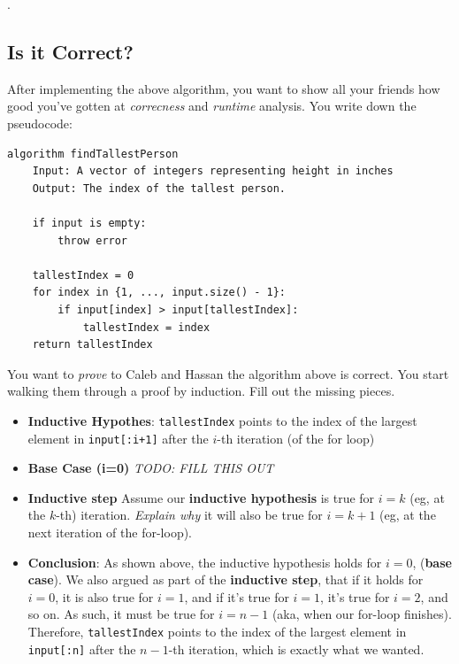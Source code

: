 \documentclass [12pt]{article}
\begin{document}
.


\subsection{Is it Correct?}
 After implementing the above algorithm, you want to show all your friends how good you've gotten at \textit{correcness} and \textit{runtime} analysis. You write down the pseudocode:

\begin{verbatim}
algorithm findTallestPerson
    Input: A vector of integers representing height in inches
    Output: The index of the tallest person.

    if input is empty:
        throw error

    tallestIndex = 0
    for index in {1, ..., input.size() - 1}:
        if input[index] > input[tallestIndex]:
            tallestIndex = index
    return tallestIndex
\end{verbatim}

You want to \textit{prove} to Caleb and Hassan the algorithm above is correct. You start walking them through a proof by induction. Fill out the missing pieces.

\begin{itemize}
    \item \textbf{Inductive Hypothes}: \texttt{tallestIndex} points to the index of the largest element in \texttt{input[:i+1]} after the $i$-th iteration (of the for loop)
    \item {} \textbf{Base Case (i=0)} \textit{TODO: FILL THIS OUT}
    \item {} \textbf{Inductive step} Assume our \textbf{inductive hypothesis} is true for $i = k$ (eg, at the $k$-th) iteration. \textit{Explain why} it will also be true for $i = k + 1$ (eg, at the next iteration of the for-loop).
    \item \textbf{Conclusion}: As shown above, the inductive hypothesis holds for $i = 0$, (\textbf{base case}). We also argued as part of the \textbf{inductive step}, that if it holds for $i=0$, it is also true for $i=1$, and if it's true for $i =1$, it's true for $i=2$, and so on. As such, it must be true for $i = n -1$ (aka, when our for-loop finishes). Therefore, \texttt{tallestIndex} points to the index of the largest element in \texttt{input[:n]} after the $n-1$-th iteration, which is exactly what we wanted.
\end{itemize}
\end{document}
